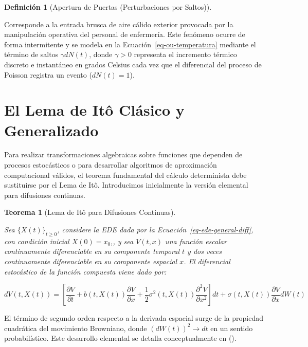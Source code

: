 \documentclass[
  spanish,
  letterpaper,
  DIV=11,
  numbers=noendperiod]{scrreprt}
\theoremstyle{plain}
\newtheorem{theorem}{Teorema}[chapter]
\theoremstyle{definition}
\newtheorem{definition}{Definición}[chapter]
\theoremstyle{remark}
\begin{document}
\begin{definition}[Apertura de Puertas (Perturbaciones por
Saltos)]\protect\hypertarget{def-apertura-puerta}{}\label{def-apertura-puerta}

Corresponde a la entrada brusca de aire cálido exterior provocada por la
manipulación operativa del personal de enfermería. Este fenómeno ocurre
de forma intermitente y se modela en la Ecuación~\ref{eq-ou-temperatura}
mediante el término de saltos \(\gamma dN(t)\), donde \(\gamma > 0\)
representa el incremento térmico discreto e instantáneo en grados
Celsius cada vez que el diferencial del proceso de Poisson registra un
evento (\(dN(t) = 1\)).

\end{definition}

\section{El Lema de Itô Clásico y
Generalizado}\label{el-lema-de-ituxf4-cluxe1sico-y-generalizado}

Para realizar transformaciones algebraicas sobre funciones que dependen
de procesos estocásticos o para desarrollar algoritmos de aproximación
computacional válidos, el teorema fundamental del cálculo determinista
debe sustituirse por el Lema de Itô. Introducimos inicialmente la
versión elemental para difusiones continuas.

\begin{theorem}[Lema de Itô para Difusiones
Continuas]\protect\hypertarget{thm-ito-clasico}{}\label{thm-ito-clasico}

Sea \(\{X(t)\}_{t \ge 0}\), considere la EDE dada por la
Ecuación~\ref{eq-ede-general-diff}, con condición inicial
\(X(0) = x_0\),, y sea \(V(t, x)\) una función escalar continuamente
diferenciable en su componente temporal \(t\) y dos veces continuamente
diferenciable en su componente espacial \(x\). El diferencial
estocástico de la función compuesta viene dado por:

\[
dV(t, X(t)) = \left[ \frac{\partial V}{\partial t} + b(t, X(t))\frac{\partial V}{\partial x} + \frac{1}{2}\sigma^2(t, X(t))\frac{\partial^2 V}{\partial x^2} \right] dt + \sigma(t, X(t))\frac{\partial V}{\partial x} dW(t)
\]

\end{theorem}

El término de segundo orden respecto a la derivada espacial surge de la
propiedad cuadrática del movimiento Browniano, donde
\((dW(t))^2 \to dt\) en un sentido probabilístico. Este desarrollo
elemental se detalla conceptualmente en
().
\end{document}
